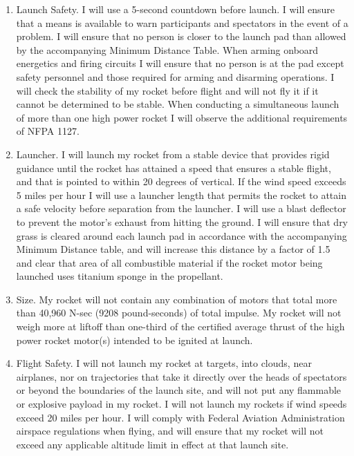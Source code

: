 \begin{enumerate}
	\item Launch Safety. I will use a 5-second countdown before launch. I will ensure that a means is available to warn participants and spectators in the event of a problem. I will ensure that no person is closer to the launch pad than allowed by the accompanying Minimum Distance Table. When arming onboard energetics and firing circuits I will ensure that no person is at the pad except safety personnel and those required for arming and disarming operations. I will check the stability of my rocket before flight and will not fly it if it cannot be determined to be stable. When conducting a simultaneous launch of more than one high power rocket I will observe the additional requirements of NFPA 1127.\par

	\item Launcher. I will launch my rocket from a stable device that provides rigid guidance until the rocket has attained a speed that ensures a stable flight, and that is pointed to within 20 degrees of vertical. If the wind speed exceeds 5 miles per hour I will use a launcher length that permits the rocket to attain a safe velocity before separation from the launcher. I will use a blast deflector to prevent the motor’s exhaust from hitting the ground. I will ensure that dry grass is cleared around each launch pad in accordance with the accompanying Minimum Distance table, and will increase this distance by a factor of 1.5 and clear that area of all combustible material if the rocket motor being launched uses titanium sponge in the propellant.\par

	\item Size. My rocket will not contain any combination of motors that total more than 40,960 N-sec (9208 pound-seconds) of total impulse. My rocket will not weigh more at liftoff than one-third of the certified average thrust of the high power rocket motor(s) intended to be ignited at launch.\par

	\item Flight Safety. I will not launch my rocket at targets, into clouds, near airplanes, nor on trajectories that take it directly over the heads of spectators or beyond the boundaries of the launch site, and will not put any flammable or explosive payload in my rocket. I will not launch my rockets if wind speeds exceed 20 miles per hour. I will comply with Federal Aviation Administration airspace regulations when flying, and will ensure that my rocket will not exceed any applicable altitude limit in effect at that launch site.\par


\end{enumerate}
